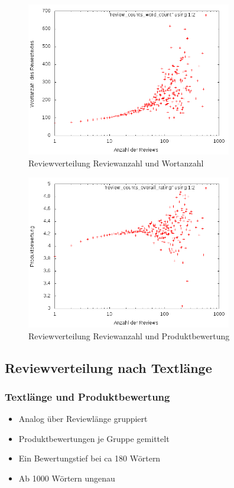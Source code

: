 \documentclass{beamer}
\begin{document}
		\begin{frame}
	\begin{figure}[H]
\centering
    \includegraphics[width=0.8\textwidth]{_results/word_count2.png}
    \caption{Reviewverteilung Reviewanzahl und Wortanzahl}
\end{figure}
	\end{frame}
	
		\begin{frame}
	\begin{figure}[H]
\centering
    \includegraphics[width=0.8\textwidth]{_results/rating_count.png}
    \caption{Reviewverteilung Reviewanzahl und Produktbewertung}
\end{figure}
	\end{frame}
	
	\begin{frame}
	\subsection{Reviewverteilung nach Textlänge}
	\frametitle{Textlänge und Produktbewertung}
	\begin{itemize}
	\item Analog über Reviewlänge gruppiert
	\item Produktbewertungen je Gruppe gemittelt
	\item Ein Bewertungstief bei ca 180 Wörtern
	\item Ab 1000 Wörtern ungenau
	\end{itemize}
	\end{frame}
		
\end{document}
